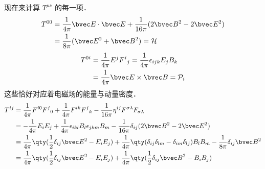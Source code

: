 现在来计算 $T^{\mu\nu}$ 的每一项．
\begin{equation}
\begin{aligned}
T^{00}&=\frac{1}{4\pi}\bvec E \cdot \bvec E+\frac{1}{16\pi}(2\bvec B^2-2\bvec E^2)\\
&=\frac{1}{8\pi}(\bvec E^2+\bvec B^2)=\mathcal{H}
\end{aligned}
\end{equation}
\begin{equation}
\begin{aligned}
T^{0i}&=\frac{1}{4\pi}E^j F^i{}_j=\frac{1}{4\pi}\epsilon_{ijk}E_jB_k\\
&=\frac{1}{4\pi}\bvec E\times \bvec B=\mathcal{P}_i
\end{aligned}
\end{equation}
这些恰好对应着电磁场的能量与动量密度．
\begin{equation}
\begin{aligned}
T^{ij}&=\frac{1}{4\pi}F^{i0}F^j{}_0+\frac{1}{4\pi}F^{ik}F^j{}_k-\frac{1}{16\pi}\eta^{ij}F^{\sigma\lambda}F_{\sigma\lambda}\\
&=-\frac{1}{4\pi}E_iE_j+\frac{1}{4\pi}\epsilon_{ikl}B_l \epsilon_{jkm}B_m-\frac{1}{16\pi}\delta_{ij}(2\bvec B^2-2\bvec E^2)\\
&=\frac{1}{4\pi}\qty(\frac{1}{2}\delta_{ij}\bvec E^2-E_iE_j)+\frac{1}{4\pi}\qty(\delta_{ij}\delta_{lm}-\delta_{im}\delta_{lj})B_lB_m-\frac{1}{8\pi}\delta_{ij}\bvec B^2\\
&=\frac{1}{4\pi}\qty(\frac{1}{2}\delta_{ij}\bvec E^2-E_iE_j)+\frac{1}{4\pi}\qty(\frac{1}{2}\delta_{ij}\bvec B^2 - B_iB_j)
\end{aligned}
\end{equation}
